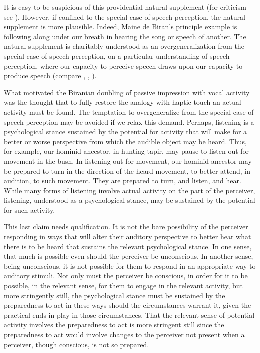 It is easy to be suspicious of this providential natural supplement (for criticism see \citealt[Chapter 7]{Derrida:2005aa}). However, if confined to the special case of speech perception, the natural supplement is more plausible. Indeed, Maine de Biran's principle example is following along under our breath in hearing the song or speech of another. The natural supplement is charitably understood as an overgeneralization from the special case of speech perception, on a particular understanding of speech perception, where our capacity to perceive speech draws upon our capacity to produce speech (compare \citealt[Chapter 2]{Bergson:1912pi}, \citealt{Liberman:1985ty}, \citealt{Mole:2009hl}). 

What motivated the Biranian doubling of passive impression with vocal activity was the thought that to fully restore the analogy with haptic touch an actual activity must be found. The temptation to overgeneralize from the special case of speech perception may be avoided if we relax this demand. Perhaps, listening is a psychological stance sustained by the potential for activity that will make for a better or worse perspective from which the audible object may be heard. Thus, for example, our hominid ancestor, in hunting tapir, may pause to listen out for movement in the bush. In listening out for movement, our hominid ancestor may be prepared to turn in the direction of the heard movement, to better attend, in audition, to such movement. They are prepared to turn, and listen, and hear. While many forms of listening involve actual activity on the part of the perceiver, listening, understood as a psychological stance, may be sustained by the potential for such activity.

This last claim needs qualification. It is not the bare possibility of the perceiver responding in ways that will alter their auditory perspective to better hear what there is to be heard that sustains the relevant psychological stance. In one sense, that much is possible even should the perceiver be unconscious. In another sense, being unconscious, it is not possible for them to respond in an appropriate way to auditory stimuli. Not only must the perceiver be conscious, in order for it to be possible, in the relevant sense, for them to engage in the relevant activity, but more stringently still, the psychological stance must be sustained by the preparedness to act in these ways should the circumstances warrant it, given the practical ends in play in those circumstances. That the relevant sense of potential activity involves the preparedness to act is more stringent still since the preparedness to act would involve changes to the perceiver not present when a perceiver, though conscious, is not so prepared.

